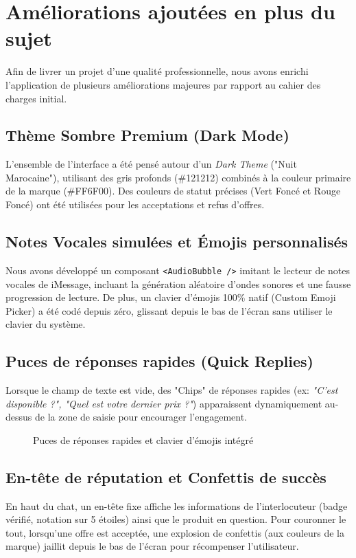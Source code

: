 \documentclass[12pt,a4paper]{report}
\begin{document}
\chapter{Améliorations ajoutées en plus du sujet}

Afin de livrer un projet d'une qualité professionnelle, nous avons enrichi l'application de plusieurs améliorations majeures par rapport au cahier des charges initial.

\section{Thème Sombre Premium (Dark Mode)}
L'ensemble de l'interface a été pensé autour d'un \textit{Dark Theme} ("Nuit Marocaine"), utilisant des gris profonds (\#121212) combinés à la couleur primaire de la marque (\#FF6F00). Des couleurs de statut précises (Vert Foncé et Rouge Foncé) ont été utilisées pour les acceptations et refus d'offres.

\section{Notes Vocales simulées et Émojis personnalisés}
Nous avons développé un composant \texttt{<AudioBubble />} imitant le lecteur de notes vocales de iMessage, incluant la génération aléatoire d'ondes sonores et une fausse progression de lecture. De plus, un clavier d'émojis 100\% natif (Custom Emoji Picker) a été codé depuis zéro, glissant depuis le bas de l'écran sans utiliser le clavier du système.

\section{Puces de réponses rapides (Quick Replies)}
Lorsque le champ de texte est vide, des "Chips" de réponses rapides (ex: \textit{"C'est disponible ?", "Quel est votre dernier prix ?"}) apparaissent dynamiquement au-dessus de la zone de saisie pour encourager l'engagement.

\begin{figure}[h]
    \centering
    \caption{Puces de réponses rapides et clavier d'émojis intégré}
\end{figure}

\section{En-tête de réputation et Confettis de succès}
En haut du chat, un en-tête fixe affiche les informations de l'interlocuteur (badge vérifié, notation sur 5 étoiles) ainsi que le produit en question. 
Pour couronner le tout, lorsqu'une offre est acceptée, une explosion de confettis (aux couleurs de la marque) jaillit depuis le bas de l'écran pour récompenser l'utilisateur.
\end{document}
